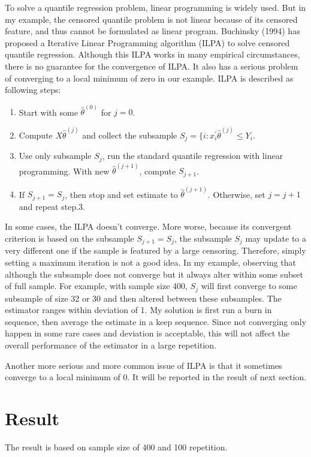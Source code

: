 \documentclass[12pt]{article}
\theoremstyle{plain} \newtheorem{theorem}{Theorem}
\theoremstyle{definition} \newtheorem{definition}{Definition}
\begin{document}
To solve a quantile regression problem, linear programming is widely used. But in my example, the censored quantile problem is not linear because of its censored feature, and thus cannot be formulated as linear program. Buchinsky (1994) has proposed a Iterative Linear Programming algorithm (ILPA) to solve censored quantile regression. Although this ILPA works in many empirical circumstances, there is no guarantee for the convergence of ILPA. It also has a serious problem of converging to a local minimum of zero in our example. ILPA is described as following steps:
\begin{enumerate}
    \item Start with some $\hat{\theta}^{(0)}$ for $j=0$.
    \item Compute $X\hat{\theta}^{(j)}$ and collect the subsample $S_j = \{ i: x_i^{'}\hat{\theta}^{(j)}\leq Y_i$.
    \item Use only subsample $S_j$, run the standard quantile regression with linear programming. With new $\hat{\theta}^{(j+1)}$, compute $S_{j+1}$.
    \item If $S_{j+1} = S_j$, then stop and set estimate to $\hat{\theta}^{(j+1)}$. Otherwise, set $j=j+1$ and repeat step.3.
\end{enumerate}
In some cases, the ILPA doesn't converge. More worse, because its convergent criterion is based on the subsample $S_{j+1}=S_j$, the subsample $S_j$ may update to a very different one if the sample is featured by a large censoring. Therefore, simply setting a maximum iteration is not a good idea. In my example, observing that although the subsample does not converge but it always alter within some subset of full sample. For example, with sample size 400, $S_j$ will first converge to some subsample of size 32 or 30 and then altered between these subsamples. The estimator ranges within deviation of 1. My solution is first run a burn in sequence, then average the estimate in a keep sequence. Since not converging only happen in some rare cases and deviation is acceptable, this will not affect the overall performance of the estimator in a large repetition.

Another more serious and more common issue of ILPA is that it sometimes converge to a local minimum of 0. It will be reported in the result of next section.

\section{Result}
\label{sec:result}

The result is based on sample size of 400 and 100 repetition.
\end{document}
